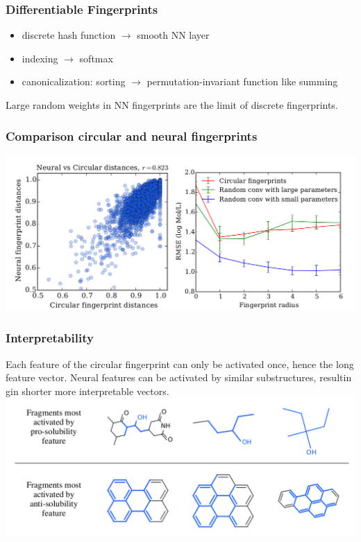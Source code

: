 \documentclass[xcolor=dvipsnames]{beamer}
\begin{document}
\begin{frame}
\frametitle{Differentiable Fingerprints}
\begin{itemize}
\item discrete hash function $\rightarrow$ smooth NN layer 
\item indexing $\rightarrow$ softmax
\item canonicalization: sorting $\rightarrow$ permutation-invariant function like summing
\end{itemize}
Large random weights in NN fingerprints are the limit of discrete fingerprints.
\end{frame}

\begin{frame}
\frametitle{Comparison circular and neural fingerprints}
\includegraphics[width=\linewidth]{img/comp.png}
\end{frame}

\begin{frame}
\frametitle{Interpretability}
Each feature of the circular fingerprint can only be activated once, hence the long feature vector. Neural features can be activated by similar substructures, resultin gin shorter more interpretable vectors.
\includegraphics[width=\linewidth]{img/interpret.png}
\end{frame}
\end{document}
